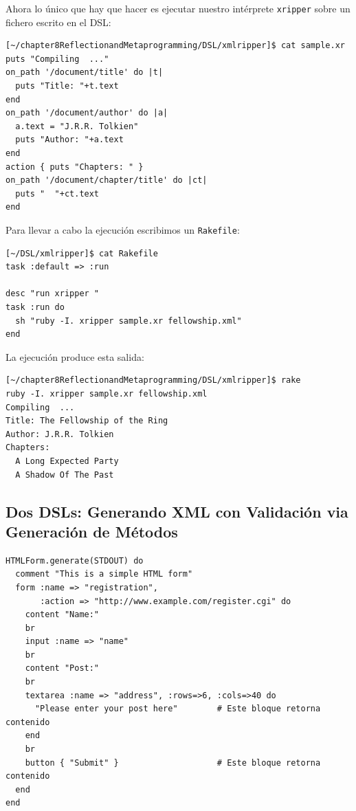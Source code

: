 
Ahora lo único que hay que hacer es ejecutar nuestro intérprete \verb|xripper| sobre un fichero
escrito en el DSL:

\begin{verbatim}
[~/chapter8ReflectionandMetaprogramming/DSL/xmlripper]$ cat sample.xr 
puts "Compiling  ..."
on_path '/document/title' do |t| 
  puts "Title: "+t.text 
end
on_path '/document/author' do |a| 
  a.text = "J.R.R. Tolkien"
  puts "Author: "+a.text 
end
action { puts "Chapters: " }
on_path '/document/chapter/title' do |ct| 
  puts "  "+ct.text 
end
\end{verbatim}

Para llevar a cabo la ejecución escribimos un \verb|Rakefile|:
\begin{verbatim}
[~/DSL/xmlripper]$ cat Rakefile 
task :default => :run

desc "run xripper "
task :run do
  sh "ruby -I. xripper sample.xr fellowship.xml"
end
\end{verbatim}
La ejecución produce esta salida:
\begin{verbatim}
[~/chapter8ReflectionandMetaprogramming/DSL/xmlripper]$ rake
ruby -I. xripper sample.xr fellowship.xml
Compiling  ...
Title: The Fellowship of the Ring
Author: J.R.R. Tolkien
Chapters: 
  A Long Expected Party
  A Shadow Of The Past
\end{verbatim}

\subsection{Dos DSLs: Generando XML con Validación via Generación de Métodos}

\begin{verbatim}
HTMLForm.generate(STDOUT) do
  comment "This is a simple HTML form"
  form :name => "registration",
       :action => "http://www.example.com/register.cgi" do
    content "Name:"
    br
    input :name => "name"
    br
    content "Post:"
    br
    textarea :name => "address", :rows=>6, :cols=>40 do
      "Please enter your post here"        # Este bloque retorna contenido
    end
    br
    button { "Submit" }                    # Este bloque retorna contenido
  end
end
\end{verbatim}


